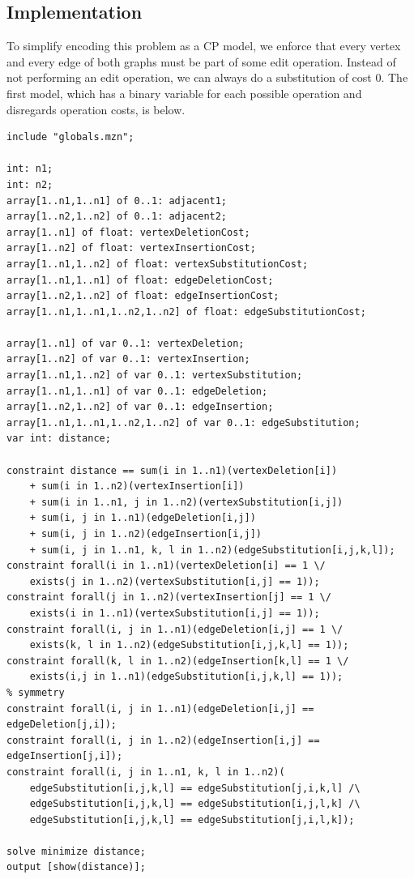 \documentclass{article}
\theoremstyle{definition}
\begin{document}
\subsection{Implementation}
To simplify encoding this problem as a CP model, we enforce that every vertex and every edge of both graphs must be part of some edit operation. Instead of not performing an edit operation, we can always do a substitution of cost 0. The first model, which has a binary variable for each possible operation and disregards operation costs, is below.
\begin{lstlisting}
include "globals.mzn";

int: n1;
int: n2;
array[1..n1,1..n1] of 0..1: adjacent1;
array[1..n2,1..n2] of 0..1: adjacent2;
array[1..n1] of float: vertexDeletionCost;
array[1..n2] of float: vertexInsertionCost;
array[1..n1,1..n2] of float: vertexSubstitutionCost;
array[1..n1,1..n1] of float: edgeDeletionCost;
array[1..n2,1..n2] of float: edgeInsertionCost;
array[1..n1,1..n1,1..n2,1..n2] of float: edgeSubstitutionCost;

array[1..n1] of var 0..1: vertexDeletion;
array[1..n2] of var 0..1: vertexInsertion;
array[1..n1,1..n2] of var 0..1: vertexSubstitution;
array[1..n1,1..n1] of var 0..1: edgeDeletion;
array[1..n2,1..n2] of var 0..1: edgeInsertion;
array[1..n1,1..n1,1..n2,1..n2] of var 0..1: edgeSubstitution;
var int: distance;

constraint distance == sum(i in 1..n1)(vertexDeletion[i])
    + sum(i in 1..n2)(vertexInsertion[i])
    + sum(i in 1..n1, j in 1..n2)(vertexSubstitution[i,j])
    + sum(i, j in 1..n1)(edgeDeletion[i,j])
    + sum(i, j in 1..n2)(edgeInsertion[i,j])
    + sum(i, j in 1..n1, k, l in 1..n2)(edgeSubstitution[i,j,k,l]);
constraint forall(i in 1..n1)(vertexDeletion[i] == 1 \/
    exists(j in 1..n2)(vertexSubstitution[i,j] == 1));
constraint forall(j in 1..n2)(vertexInsertion[j] == 1 \/
    exists(i in 1..n1)(vertexSubstitution[i,j] == 1));
constraint forall(i, j in 1..n1)(edgeDeletion[i,j] == 1 \/
    exists(k, l in 1..n2)(edgeSubstitution[i,j,k,l] == 1));
constraint forall(k, l in 1..n2)(edgeInsertion[k,l] == 1 \/
    exists(i,j in 1..n1)(edgeSubstitution[i,j,k,l] == 1));
% symmetry
constraint forall(i, j in 1..n1)(edgeDeletion[i,j] == edgeDeletion[j,i]);
constraint forall(i, j in 1..n2)(edgeInsertion[i,j] == edgeInsertion[j,i]);
constraint forall(i, j in 1..n1, k, l in 1..n2)(
    edgeSubstitution[i,j,k,l] == edgeSubstitution[j,i,k,l] /\
    edgeSubstitution[i,j,k,l] == edgeSubstitution[i,j,l,k] /\
    edgeSubstitution[i,j,k,l] == edgeSubstitution[j,i,l,k]);

solve minimize distance;
output [show(distance)];
\end{lstlisting}
\end{document}
